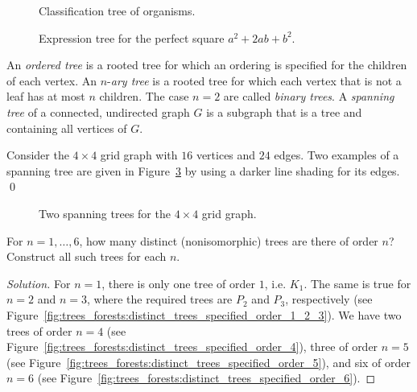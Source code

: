 \begin{figure}[!htbp]
\centering
{}

\caption{Classification tree of organisms.}
\label{fig:trees_forests:classification_tree_organisms}
\end{figure}

\begin{figure}[!htbp]
\centering
{}

\caption{Expression tree for the perfect square $a^2 + 2ab + b^2$.}
\label{fig:trees_forests:expression_tree_perfect_square}
\end{figure}

An \emph{ordered tree} is a rooted tree for which
an ordering is specified for the children of each vertex. An
$n$-\emph{ary tree} is a rooted tree for which
each vertex that is not a leaf has at most $n$ children. The case
$n = 2$ are called \emph{binary trees}. A
\emph{spanning tree} of a connected, undirected
graph $G$ is a subgraph that is a tree and containing all vertices of
$G$.

\begin{example}
\label{eg:trees_forests:spanning_tree}
{\rm
Consider the $4 \times 4$ grid graph with $16$ vertices and
$24$ edges. Two examples of a spanning tree are given in
Figure~\ref{fig:trees_forests:grid_graph_spanning_trees} by using a
darker line shading for its edges.}
\qed
\end{example}

\begin{figure}[!htbp]
\centering

\caption{Two spanning trees for the $4 \times 4$ grid graph.}
\label{fig:trees_forests:grid_graph_spanning_trees}
\end{figure}

\begin{example}
For $n = 1, \dots, 6$, how many distinct (nonisomorphic) trees are
there of order $n$? Construct all such trees for each $n$.
\end{example}

\begin{proof}[Solution]
For $n = 1$, there is only one tree of order $1$, i.e. $K_1$. The same
is true for $n = 2$ and $n = 3$, where the required trees are $P_2$
and $P_3$, respectively (see
Figure~\ref{fig:trees_forests:distinct_trees_specified_order_1_2_3}). We
have two trees of order $n = 4$ (see
Figure~\ref{fig:trees_forests:distinct_trees_specified_order_4}),
three of order $n = 5$ (see
Figure~\ref{fig:trees_forests:distinct_trees_specified_order_5}), and
six of order $n = 6$ (see
Figure~\ref{fig:trees_forests:distinct_trees_specified_order_6}).
\end{proof}

